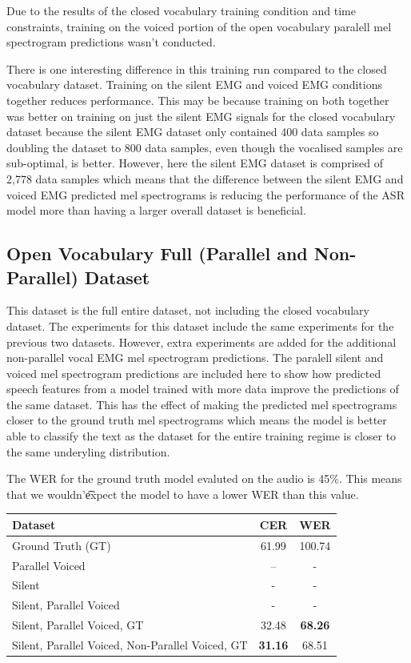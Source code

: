 Due to the results of the closed vocabulary training condition and time constraints,
training on the voiced portion of the open vocabulary paralell mel spectrogram
predictions wasn't conducted.

There is one interesting difference in this training run compared to the closed
vocabulary dataset. Training on the silent EMG and voiced EMG conditions together
reduces performance. This may be because training on both together was better
on training on just the silent EMG signals for the closed vocabulary dataset
because the silent EMG dataset only contained 400 data samples so doubling
the dataset to 800 data samples, even though the vocalised samples are sub-optimal,
is better. However, here the silent EMG dataset is comprised of 2,778 data samples
which means that the difference between the silent EMG and voiced EMG predicted
mel spectrograms is reducing the performance of the ASR model more than having a
larger overall dataset is beneficial.

\subsection{Open Vocabulary Full (Parallel and Non-Parallel) Dataset}

This dataset is the full entire dataset, not including the closed vocabulary
dataset. The experiments for this dataset include the same experiments for
the previous two datasets. However, extra experiments are added for the additional
non-parallel vocal EMG mel spectrogram predictions. The paralell silent and voiced
mel spectrogram predictions are included here to show how predicted speech features
from a model trained with more data improve the predictions of the same dataset.
This has the effect of making the predicted mel spectrograms closer to the ground
truth mel spectrograms which means the model is better able to classify the text
as the dataset for the entire training regime is closer to the same underyling distribution.

The WER for the ground truth model evaluted on the audio is 45\%. This means that we wouldn'\t
expect the model to have a lower WER than this value.

{\small\begin{center}
\begin{tabular} {  l  c  c  }
\hline
\textbf{Dataset} & \textbf{CER} & \textbf{WER} \\
\hline
Ground Truth (GT) & 61.99 & 100.74 \\
Parallel Voiced & -- & - \\
Silent & - & - \\
Silent, Parallel Voiced & - & - \\
\hline
Silent, Parallel Voiced, GT & 32.48 & \textbf{68.26} \\
Silent, Parallel Voiced, Non-Parallel Voiced, GT & \textbf{31.16} & 68.51 \\
\hline
\end{tabular}
\end{center}}

